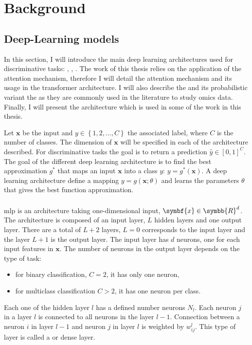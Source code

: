 \documentclass[../main.tex]{subfiles}
\begin{document}
\chapter{Background}\label{chap:background}
\minitocpage

\section{Deep-Learning models}
 In this section, I will introduce the main deep learning architectures used for discriminative tasks: , , .
 The work of this thesis relies on the application of the attention mechanism, therefore I will detail the attention mechanism and its usage in the transformer architecture.
 I will also describe the  and its probabilistic variant the  as they are commonly used in the literature to study omics data.
 Finally, I will present the  architecture which is used in some of the work in this thesis.

 Let \(\symbf{x}\) be the input and \(y \in \left\{1,2, \ldots, C \right\} \) the associated label, where \(C\) is the number of classes.
 The dimension of \(\symbf{x}\) will be specified in each of the architecture described.
 For discriminative tasks the goal is to return a prediction \(\hat{y} \in {\left[0,1\right]}^C\).
 The goal of the different deep learning architecture is to find the best approximation \(g^{*}\) that maps an input \(\symbf{x}\) into a class \(y\): \(y = g^{*}\left(\symbf{x}\right)\).
 A deep learning architecture define a mapping \(y=g\left(\symbf{x}; \theta\right)\) and learns the parameters \(\theta\) that gives the best function approximation.


 \subsection{}\label{subsec:mlp}
	 \Gls{mlp} is an architecture taking one-dimensional input, \(\symbf{x} \in \symbb{R}^d\).
	 The architecture is composed of an input layer, \(L\) hidden layers and one output layer.
	 There are a total of \(L+2\) layers, \(L=0\) corresponds to the input layer and the layer \(L+1\) is the output layer.
	 The input layer has \(d\) neurons, one for each input features in \(\symbf{x}\).
	 The number of neurons in the output layer depends on the type of task:
	 \begin{itemize}
		 \item for binary classification, \(C=2\), it has only one neuron,
		 \item for multiclass classification \(C > 2 \), it has one neuron per class.
	 \end{itemize}
	 Each one of the hidden layer \(l\) has a defined number neurons \(N_{l}\).
	 Each neuron \(j\) in a layer \(l\) is connected to all neurons in the layer \(l-1\).
	 Connection between a neuron \(i\) in layer \(l-1\) and neuron \(j\) in layer \(l\) is weighted by \(w^{l}_{ij}\).
	 This type of layer is called a  or dense layer.
\end{document}
